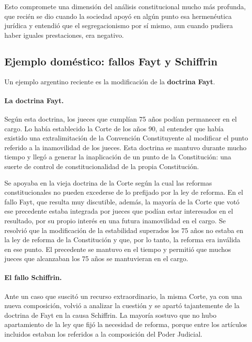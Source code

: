 \documentclass[12pt,oneside]{book}
\begin{document}
Esto compromete una dimensión del análisis constitucional mucho más profunda, que recién se dio cuando la sociedad apoyó en algún punto esa hermenéutica jurídica y entendió que el segregacionismo por sí mismo, aun cuando pudiera haber iguales prestaciones, era negativo.

\subsection{Ejemplo doméstico: fallos Fayt y Schiffrin}

Un ejemplo argentino reciente es la modificación de la \textbf{doctrina Fayt}.

\paragraph{La doctrina Fayt.} Según esta doctrina, los jueces que cumplían 75 años podían permanecer en el cargo. Lo había establecido la Corte de los años 90, al entender que había existido una extralimitación de la Convención Constituyente al modificar el punto referido a la inamovilidad de los jueces. Esta doctrina se mantuvo durante mucho tiempo y llegó a generar la inaplicación de un punto de la Constitución: una suerte de control de constitucionalidad de la propia Constitución.

Se apoyaba en la vieja doctrina de la Corte según la cual las reformas constitucionales no pueden excederse de lo prefijado por la ley de reforma. En el fallo Fayt, que resulta muy discutible, además, la mayoría de la Corte que votó ese precedente estaba integrada por jueces que podían estar interesados en el resultado, por su propio interés en una futura inamovilidad en el cargo. Se resolvió que la modificación de la estabilidad superados los 75 años no estaba en la ley de reforma de la Constitución y que, por lo tanto, la reforma era inválida en ese punto. El precedente se mantuvo en el tiempo y permitió que muchos jueces que alcanzaban los 75 años se mantuvieran en el cargo.

\paragraph{El fallo Schiffrin.} Ante un caso que suscitó un recurso extraordinario, la misma Corte, ya con una nueva composición, volvió a analizar la cuestión y se apartó tajantemente de la doctrina de Fayt en la causa Schiffrin. La mayoría sostuvo que no hubo apartamiento de la ley que fijó la necesidad de reforma, porque entre los artículos incluidos estaban los referidos a la composición del Poder Judicial.
\end{document}
